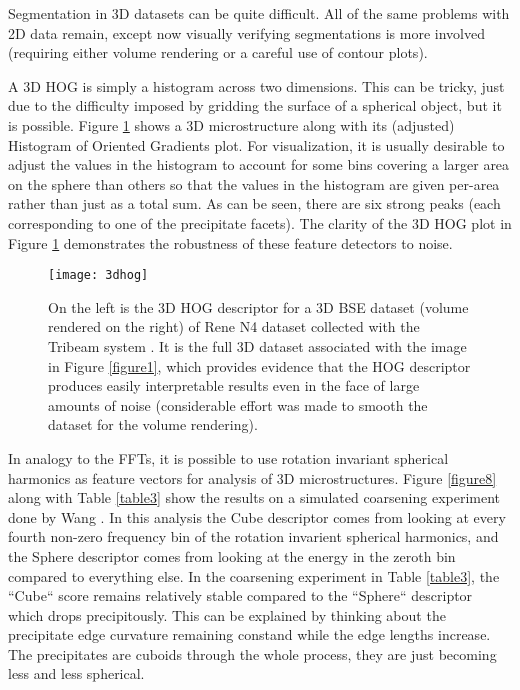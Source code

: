\documentclass[review]{elsarticle}
\begin{document}
	Segmentation in 3D datasets can be quite difficult. All of the same problems with 2D data remain, except now visually verifying segmentations is more involved (requiring either volume rendering or a careful use of contour plots).

	A 3D HOG is simply a histogram across two dimensions. This can be tricky, just due to the difficulty imposed by gridding the surface of a spherical object, but it is possible. Figure \ref{figure4} shows a 3D microstructure along with its (adjusted) Histogram of Oriented Gradients plot. For visualization, it is usually desirable to adjust the values in the histogram to account for some bins covering a larger area on the sphere than others so that the values in the histogram are given per-area rather than just as a total sum. As can be seen, there are six strong peaks (each corresponding to one of the precipitate facets). The clarity of the 3D HOG plot in Figure \ref{figure4} demonstrates the robustness of these feature detectors to noise.
	
	\begin{figure}[!ht]
  		\centering
    	\texttt{[image: 3dhog]}
  		\caption{ On the left is the 3D HOG descriptor for a 3D BSE dataset (volume rendered on the right) of Rene N4 dataset collected with the Tribeam system \cite{tribeam}. It is the full 3D dataset associated with the image in Figure \ref{figure1}, which provides evidence that the HOG descriptor produces easily interpretable results even in the face of large amounts of noise (considerable effort was made to smooth the dataset for the volume rendering). }
  		\label{figure4}
	\end{figure}

	In analogy to the FFTs, it is possible to use rotation invariant spherical harmonics \cite{spherical} as feature vectors for analysis of 3D microstructures. Figure \ref{figure8} along with Table \ref{table3} show the results on a simulated coarsening experiment done by Wang \cite{ywang2}. In this analysis the Cube descriptor comes from looking at every fourth non-zero frequency bin of the rotation invarient spherical harmonics, and the Sphere descriptor comes from looking at the energy in the zeroth bin compared to everything else. In the coarsening experiment in Table \ref{table3}, the ``Cube`` score remains relatively stable compared to the ``Sphere`` descriptor which drops precipitously. This can be explained by thinking about the precipitate edge curvature remaining constand while the edge lengths increase. The precipitates are cuboids through the whole process, they are just becoming less and less spherical.
	
\end{document}
